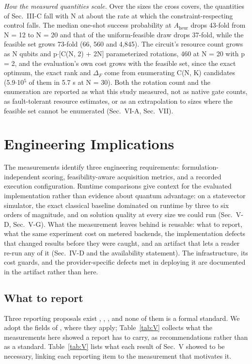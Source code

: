 \documentclass{ieeeaccess}
\begin{document}
\textit{How the measured quantities scale.} Over the sizes the cross covers, the quantities of Sec.~III-C fall with N at about the rate at which the constraint-respecting control falls. The median one-shot success probability at $A_{\mathrm{heur}}$ drops 43-fold from N = 12 to N = 20 and that of the uniform-feasible draw drops 37-fold, while the feasible set grows 73-fold (66, 560 and 4,845). The circuit's resource count grows as N qubits and p$\cdot$[C(N, 2) + 2N] parameterized rotations, 460 at N = 20 with p = 2, and the evaluation's own cost grows with the feasible set, since the exact optimum, the exact rank and $\Delta_{F}$ come from enumerating C(N, K) candidates (5.9$\cdot$10$^{5}$ of them in 5.7 s at N = 30). Both the rotation count and the enumeration are reported as what this study measured, not as native gate counts, as fault-tolerant resource estimates, or as an extrapolation to sizes where the feasible set cannot be enumerated (Sec.~VI-A, Sec.~VII).


\section{Engineering Implications}


The measurements identify three engineering requirements: formulation-independent scoring, feasibility-aware acquisition metrics, and a recorded execution configuration. Runtime comparisons give context for the evaluated implementation rather than evidence about quantum advantage: on a statevector simulator, the exact classical baseline dominated on runtime by three to six orders of magnitude, and on solution quality at every size we could run (Sec.~V-D, Sec.~V-G). What the measurement leaves behind is reusable: what to report, what the same experiment cost on metered backends, the implementation defects that changed results before they were caught, and an artifact that lets a reader re-run any of it (Sec.~IV-D and the availability statement). The infrastructure, its cost guards, and the provider-specific defects met in deploying it are documented in the artifact rather than here.


\subsection{What to report}


Three reporting proposals exist \cite{ref22}, \cite{ref23}, \cite{ref24}, and none of them is a formal standard. We adopt the fields of \cite{ref22}, \cite{ref23} where they apply; Table~\ref{tab:V} collects what the measurements here showed a report has to carry, as recommendations rather than as a standard. Table~\ref{tab:V} lists what each result of Sec.~V showed to be necessary, linking each reporting item to the measurement that motivates it.
\end{document}
